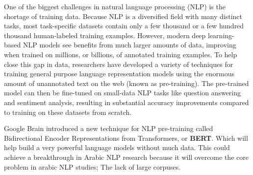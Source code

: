 One of the biggest challenges in natural language processing (NLP) is the shortage of training data. Because NLP is a diversified field with many distinct tasks, most task-specific datasets contain only a few thousand or a few hundred thousand human-labeled training examples. However, modern deep learning-based NLP models see benefits from much larger amounts of data, improving when trained on millions, or billions, of annotated training examples. To help close this gap in data, researchers have developed a variety of techniques for training general purpose language representation models using the enormous amount of unannotated text on the web (known as pre-training). The pre-trained model can then be fine-tuned on small-data NLP tasks like question answering and sentiment analysis, resulting in substantial accuracy improvements compared to training on these datasets from scratch. 

Google Brain introduced a new technique for NLP pre-training called Bidirectional Encoder Representations from Transformers, or \textbf{BERT}. Which will help build a very powerful language models without much data. This could achieve a breakthrough in Arabic NLP research because it will overcome the core problem in arabic NLP studies; The lack of large corpuses.

